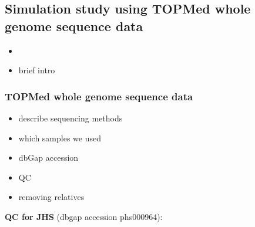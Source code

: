 \documentclass[12pt]{article}
\newcommand{\edit}[1]{{\color{red}{#1}}}
\newcommand{\add}[1]{{\color{red}{[... #1 ...]}}}
\begin{document}
\add{Comment on both PCA and model-based approaches (e.g., ADMIXTURE, RFMix, other ancestry inference software)}


\subsection{Simulation study using TOPMed whole genome sequence data}

\begin{itemize}
\item \edit{Need to decide if we're using TOPMed or WHI data}
\item brief intro
\end{itemize}


\subsubsection{TOPMed whole genome sequence data}

\begin{itemize}
\item describe sequencing methods
\item which samples we used
\item dbGap accession
\item QC
\item removing relatives
\end{itemize}


\textbf{QC for JHS} (dbgap accession phs000964):
\end{document}
